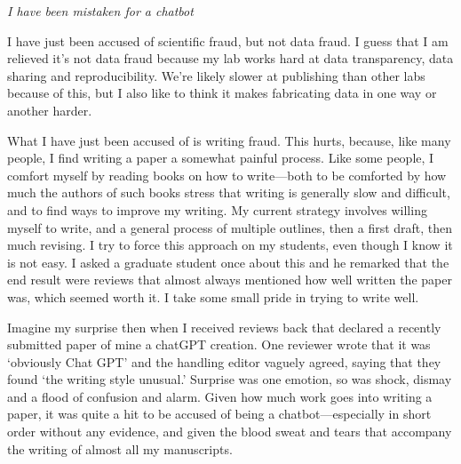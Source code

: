\documentclass[11pt]{article}
\begin{document}

\renewcommand{\refname}{\CHead{}}


\emph{I have been mistaken for a chatbot}%


I have just been accused of scientific fraud, but not data fraud. I guess that I am relieved it's not data fraud because my lab works hard at data transparency, data sharing and reproducibility. We're likely slower at publishing than other labs because of this, but I also like to think it makes fabricating data in one way or another harder. 

What I have just been accused of is writing fraud. This hurts, because, like many people, I find writing a paper a somewhat painful process. %
Like some people, I comfort myself by reading books on how to write---both to be comforted by how much the authors of such books stress that writing is generally slow and difficult, and to find ways to improve my writing. My current strategy involves willing myself to write, and a general process of multiple outlines, then a first draft, then much revising. I try to force this approach on my students, even though I know it is not easy. I asked a graduate student once about this and he remarked that the end result were reviews that almost always mentioned how well written the paper was, which seemed worth it. I take some small pride in trying to write well.

Imagine my surprise then when I received reviews back that declared a recently submitted paper of mine a chatGPT creation. One reviewer wrote that it was `obviously Chat GPT' and the handling editor vaguely agreed, saying that they found `the writing style unusual.' Surprise was one emotion, so was shock, dismay and a flood of confusion and alarm. Given how much work goes into writing a paper, it was quite a hit to be accused of being a chatbot---especially in short order without any evidence, and given the blood sweat and tears that accompany the writing of almost all my manuscripts. 
\end{document}

